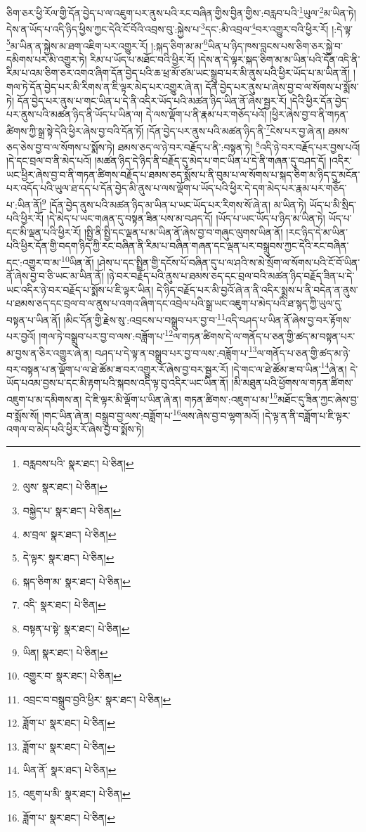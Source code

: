 ཅིག་ཅར་ཕྱི་རོལ་གྱི་དོན་བྱེད་པ་ལ་འཇུག་པར་ནུས་པའི་རང་བཞིན་གྱིས་བྱིན་གྱིས་:བརླབ་པའི་\footnote{བརླབས་པའི་  སྣར་ཐང་།  པེ་ཅིན། }ཡུལ་\footnote{ལུས་  སྣར་ཐང་།  པེ་ཅིན། }མ་ཡིན་ཏེ། དེས་ན་ཡོད་པ་འདི་ཉིད་ཕྱིས་ཀྱང་དེའི་ངོ་བོའི་འབྲས་བུ་:སྐྱེས་པ་\footnote{བསྐྱེད་པ་  སྣར་ཐང་།  པེ་ཅིན། }དང་:མི་འབྲལ་\footnote{མ་བྲལ་  སྣར་ཐང་།  པེ་ཅིན། }བར་འགྱུར་བའི་ཕྱིར་རོ། །:དེ་ལྟ་\footnote{དེ་ལྟར་  སྣར་ཐང་།  པེ་ཅིན། }མ་ཡིན་ན་སྐྱེས་མ་ཐག་འཇིག་པར་འགྱུར་རོ། །:སྐད་ཅིག་མ་མ་\footnote{སྐད་ཅིག་མ་  སྣར་ཐང་།  པེ་ཅིན། }ཡིན་པ་ཉིད་ཁས་བླངས་པས་ཅིག་ཅར་སྐྱེ་བ་དམིགས་པར་མི་འགྱུར་ཏེ། རིམ་པ་ཡོད་པ་མཐོང་བའི་ཕྱིར་རོ། །དེས་ན་དེ་ལྟར་སྐད་ཅིག་མ་མ་ཡིན་པའི་དོན་འདི་ནི་རིམ་པ་འམ་ཅིག་ཅར་འགའ་ཞིག་དོན་བྱེད་པའི་ཆ་ཕྲ་མོ་ཙམ་ཡང་སྒྲུབ་པར་མི་ནུས་པའི་ཕྱིར་ཡོད་པ་མ་ཡིན་ནོ། །གལ་ཏེ་དོན་བྱེད་པར་མི་རིགས་ན་ཇི་ལྟར་མེད་པར་འགྱུར་ཞེ་ན། དོན་བྱེད་པར་ནུས་པ་ཞེས་བྱ་བ་ལ་སོགས་པ་སྨོས་ཏེ། དོན་བྱེད་པར་ནུས་པ་གང་ཡིན་པ་དེ་ནི་འདིར་ཡོད་པའི་མཚན་ཉིད་ཡིན་ནོ་ཞེས་སྦྱར་རོ། །དེའི་ཕྱིར་དོན་བྱེད་པར་ནུས་པའི་མཚན་ཉིད་ནི་ཡོད་པ་ཡིན་ལ། དེ་ལས་ལྡོག་པ་ནི་རྣམ་པར་གཅོད་པའོ། །ཕྱིར་ཞེས་བྱ་བ་ནི་གཏན་ཚིགས་ཀྱི་སྒྲ་སྟེ་དེའི་ཕྱིར་ཞེས་བྱ་བའི་དོན་ཏོ། །དོན་བྱེད་པར་ནུས་པའི་མཚན་ཉིད་ནི་\footnote{འདི་  སྣར་ཐང་།  པེ་ཅིན། }ངེས་པར་བྱ་ཞེ་ན། ཐམས་ཅད་ཅེས་བྱ་བ་ལ་སོགས་པ་སྨོས་ཏེ། ཐམས་ཅད་ལ་ཉེ་བར་བརྗོད་པ་ནི་:བསྟན་ཏེ། \footnote{བསྟན་པ་སྟེ་  སྣར་ཐང་།  པེ་ཅིན། }འདི་ཉེ་བར་བརྗོད་པར་བྱས་པའོ། །དེ་དང་བྲལ་བ་ནི་མེད་པའོ། །མཚན་ཉིད་དེ་ཉིད་ནི་བརྗོད་དུ་མེད་པ་གང་ཡིན་པ་དེ་ནི་གཞན་དུ་བཤད་དོ། །འདིར་ཡང་ཕྱིར་ཞེས་བྱ་བ་ནི་གཏན་ཚིགས་བརྗོད་པ་ཐམས་ཅད་སྨོས་པ་ནི་བུམ་པ་ལ་སོགས་པ་སྐད་ཅིག་མ་ཉིད་དུ་མངོན་པར་འདོད་པའི་ཡུལ་ཐ་དད་པ་དོན་བྱེད་མི་ནུས་པ་ལས་ལྡོག་པ་ཡོད་པའི་ཕྱིར་དེ་དག་མེད་པར་རྣམ་པར་གཅོད་པ་:ཡིན་ནོ།\footnote{ཡིན།  སྣར་ཐང་།  པེ་ཅིན། } །དོན་བྱེད་ནུས་པའི་མཚན་ཉིད་མ་ཡིན་པ་ཡང་ཡོད་པར་རིགས་སོ་ཞེ་ན། མ་ཡིན་ཏེ། ཡོད་པ་མི་སྲིད་པའི་ཕྱིར་རོ། །དེ་མེད་པ་ཡང་གཞན་དུ་བསྟན་ཟིན་པས་མ་བཤད་དོ། །ཡོད་པ་ཡང་ཡོད་པ་ཉིད་མ་ཡིན་ཏེ། ཡོད་པ་དང་མི་ལྡན་པའི་ཕྱིར་རོ། །སྤྱི་ནི་སྤྱི་དང་ལྡན་པ་མ་ཡིན་ནོ་ཞེས་བྱ་བ་གཞུང་ལུགས་ཡིན་ནོ། །རང་ཉིད་དེ་མ་ཡིན་པའི་ཕྱིར་དོན་གྱི་བདག་ཉིད་ཀྱི་རང་བཞིན་ནི་རིམ་པ་བཞིན་གཞན་དང་ལྡན་པར་བསྒྲུབས་ཀྱང་དེའི་རང་བཞིན་དང་:འགྱུར་བ་མ་\footnote{འགྱུར་བ་  སྣར་ཐང་།  པེ་ཅིན། }ཡིན་ནོ། །ཤེས་པ་དང་སྤྲིན་གྱི་དངོས་པོ་བཞིན་དུ་པ་ལ་ཤའི་ས་མེ་སྲོག་ལ་སོགས་པའི་ངོ་བོ་ཡིན་ནོ་ཞེས་བྱ་བ་ཅི་ཡང་མ་ཡིན་ནོ། །ཉེ་བར་བརྗོད་པའི་ནུས་པ་ཐམས་ཅད་དང་བྲལ་བའི་མཚན་ཉིད་བརྗོད་ཟིན་པ་དེ་ཡང་འདིར་ཉེ་བར་བརྗོད་པ་སྨོས་པ་ཇི་ལྟར་ཡིན། དེ་ཉིད་བརྗོད་པར་མི་བྱའོ་ཞེ་ན་ནི་འདིར་སྨྲས་པ་ནི་བདེན་ན་ནུས་པ་ཐམས་ཅད་དང་བྲལ་བ་ལ་ནུས་པ་འགའ་ཞིག་དང་འབྲེལ་པའི་སྒྲ་ཡང་འཇུག་པ་མེད་པའི་ཐ་སྙད་ཀྱི་ཡུལ་དུ་བསྟན་པ་ཡིན་ནོ། །མིང་དོན་གྱི་རྗེས་སུ་:འབྲངས་པ་བསྒྲུབ་པར་བྱ་བ་\footnote{འབྲང་བ་བསྒྲུབ་བྱའི་ཕྱིར་  སྣར་ཐང་།  པེ་ཅིན། }འདི་བཤད་པ་ཡིན་ནོ་ཞེས་བྱ་བར་རྟོགས་པར་བྱའོ། །གལ་ཏེ་བསྒྲུབ་པར་བྱ་བ་ལས་:བཟློག་པ་\footnote{ཟློག་པ་  སྣར་ཐང་།  པེ་ཅིན། }ལ་གཏན་ཚིགས་དེ་ལ་གནོད་པ་ཅན་གྱི་ཚད་མ་བསྟན་པར་མ་བྱས་ན་ཅིར་འགྱུར་ཞེ་ན། བཤད་པ་དེ་ལྟ་ན་བསྒྲུབ་པར་བྱ་བ་ལས་:བཟློག་པ་\footnote{ཟློག་པ་  སྣར་ཐང་།  པེ་ཅིན། }ལ་གནོད་པ་ཅན་གྱི་ཚད་མ་ཉེ་བར་བསྟན་པ་ན་ལྡོག་པ་ལ་ཐེ་ཚོམ་ཟ་བར་འགྱུར་རོ་ཞེས་བྱ་བར་སྦྱར་རོ། །དེ་གང་ལ་ཐེ་ཚོམ་ཟ་བ་ཡིན་\footnote{ཡིན་ནོ་  སྣར་ཐང་།  པེ་ཅིན། }ཞེ་ན། དེ་ཡོད་པའམ་བྱས་པ་དང་མི་རྟག་པའི་སྐབས་འདི་ལྟ་བུ་འདིར་ཡང་ཡིན་ནོ། །མི་མཐུན་པའི་ཕྱོགས་ལ་གཏན་ཚིགས་འཇུག་པ་མ་དམིགས་ན། དེ་ཇི་ལྟར་མི་ལྡོག་པ་ཡིན་ཞེ་ན། གཏན་ཚིགས་:འཇུག་པ་མ་\footnote{འཇུག་པ་མི་  སྣར་ཐང་།  པེ་ཅིན། }མཐོང་དུ་ཟིན་ཀྱང་ཞེས་བྱ་བ་སྨོས་སོ། །གང་ཡིན་ཞེ་ན། བསྒྲུབ་བྱ་ལས་:བཟློག་པ་\footnote{ཟློག་པ་  སྣར་ཐང་།  པེ་ཅིན། }ལས་ཞེས་བྱ་བ་ལྷག་མའོ། །དེ་ལྟ་ན་ནི་བཟློག་པ་ཇི་ལྟར་འགལ་བ་མེད་པའི་ཕྱིར་རོ་ཞེས་བྱ་བ་སྨོས་ཏེ། 